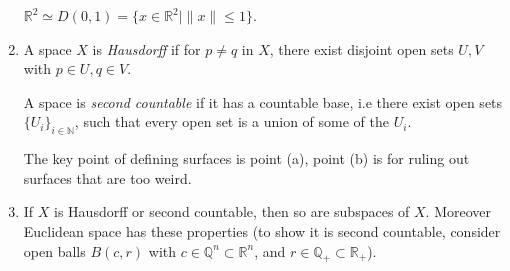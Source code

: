 \documentclass[12pt]{article}
\begin{document}
\begin{remark}
	\begin{enumerate}
		$\mathbb{R}^2 \simeq D(0,1) = \{x \in \mathbb{R}^2 \mid \|x\| \leq 1\}$.
		\item A space $X$ is \emph{Hausdorff} if for $p \neq q$ in $X$, there exist disjoint open sets $U, V$ with $p \in U, q \in V$.

			A space is \emph{second countable} if it has a countable base, i.e there exist open sets $\{U_i\}_{i \in \mathbb{N}}$, such that every open set is a union of some of the $U_i$.

			The key point of defining surfaces is point (a), point (b) is for ruling out surfaces that are too weird.
		\item If $X$ is Hausdorff or second countable, then so are subspaces of $X$. Moreover Euclidean space has these properties (to show it is second countable, consider open balls $B(c, r)$ with $c \in \mathbb{Q}^{n} \subset \mathbb{R}^{n}$, and $r \in \mathbb{Q}_{+} \subset \mathbb{R}_{+}$).
	\end{enumerate}
\end{remark}
\end{document}
